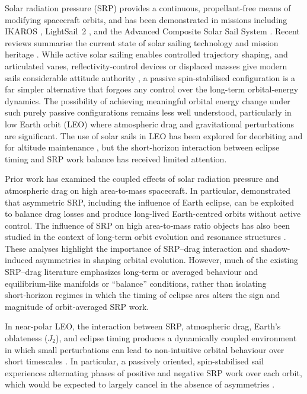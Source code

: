 \FloatBarrier
\noindent Solar radiation pressure (SRP) provides a continuous, propellant-free means of modifying spacecraft orbits, and has been demonstrated in missions including IKAROS \citep{tsuda2011ikaros,sawadaMissionReportSolar2011}, LightSail~2 \citep{spencerLightSail2Solar2021}, and the Advanced Composite Solar Sail System \citep{wilkieOverviewNASAAdvanced2021}. Recent reviews summarise the current state of solar sailing technology and mission heritage \citep{johnsonSolarSailsTechnology2012,yakezerashviliRecentAdvancesSpace2025}. While active solar sailing enables controlled trajectory shaping, and articulated vanes, reflectivity-control devices or displaced masses give modern sails considerable attitude authority \citep{abrishamiOptimizedControlAllocation2020}, a passive spin-stabilised configuration is a far simpler alternative that forgoes any control over the long-term orbital-energy dynamics. The possibility of achieving meaningful orbital energy change under such purely passive configurations remains less well understood, particularly in low Earth orbit (LEO) where atmospheric drag and gravitational perturbations are significant. The use of solar sails in LEO has been explored for deorbiting \citep{stohlmanDevelopmentDeorbitsailFlight2014,lucking2012solar} and for altitude maintenance \citep{berthetSunflowerMissionConcept2023}, but the short-horizon interaction between eclipse timing and SRP work balance has received limited attention.

\vspace{0.5em}
\par\noindent Prior work has examined the coupled effects of solar radiation pressure and atmospheric drag on high area-to-mass spacecraft. In particular, \citet{colombomcinnes} demonstrated that asymmetric SRP, including the influence of Earth eclipse, can be exploited to balance drag losses and produce long-lived Earth-centred orbits without active control. The influence of SRP on high area-to-mass ratio objects has also been studied in the context of long-term orbit evolution and resonance structures \citep{valk2008semi}. These analyses highlight the importance of SRP–drag interaction and shadow-induced asymmetries in shaping orbital evolution. However, much of the existing SRP–drag literature emphasizes long‑term or averaged behaviour and equilibrium‑like manifolds or ``balance'' conditions, rather than isolating short‑horizon regimes in which the timing of eclipse arcs alters the sign and magnitude of orbit‑averaged SRP work.

\vspace{0.5em}
\par\noindent In near-polar LEO, the interaction between SRP, atmospheric drag, Earth’s oblateness ($J_2$), and eclipse timing produces a dynamically coupled environment in which small perturbations can lead to non-intuitive orbital behaviour over short timescales \citep{prieto2014drag}. In particular, a passively oriented, spin-stabilised sail experiences alternating phases of positive and negative SRP work over each orbit, which would be expected to largely cancel in the absence of asymmetries \citep{mcinnes1999}.


